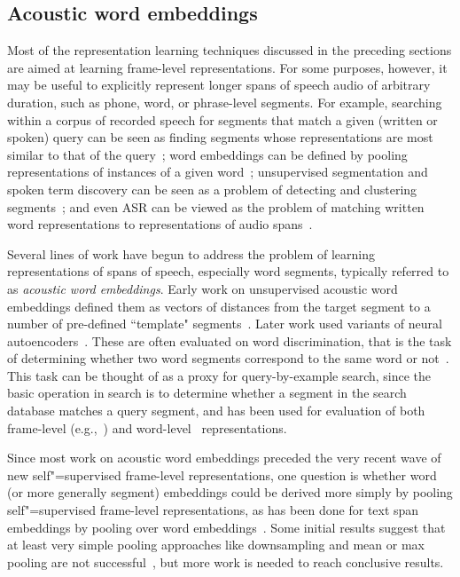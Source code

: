\subsection{Acoustic word embeddings}

Most of the representation learning techniques discussed in the preceding sections are aimed at learning frame-level representations. For some purposes, however, it may be useful to explicitly represent longer spans of speech audio of arbitrary duration, such as phone, word, or phrase-level segments.  For example, searching within a corpus of recorded speech for segments that match a given (written or spoken) query can be seen as finding segments whose representations are most similar to that of the query~\parencite{levin_segmental_2015,chen_querybyexample_2015,chung_audio_2016,settle_querybyexample_2017}; word embeddings can be defined by pooling representations of instances of a given word~\parencite{chung_speech2vec_2018}; unsupervised segmentation and spoken term discovery can be seen as a problem of detecting and clustering segments~\parencite{kamper_embedded_2017,kamper_segmental_2017}; and even ASR can be viewed as the problem of matching written word representations to representations of audio spans~\parencite{maas_wordlevel_2012,bengio_word_2014,settle_acoustically_2019}.  

Several lines of work have begun to address the problem of learning representations of spans of speech, especially word segments, typically referred to as \textit{acoustic word embeddings}.  Early work on unsupervised acoustic word embeddings defined them as vectors of distances from the target segment to a number of pre-defined ``template" segments~\parencite{levin_fixeddimensional_2013}. Later work used variants of neural autoencoders~\parencite{chung_audio_2016,holzenberger_learning_2018,kamper_truly_2019,peng_correspondence_2020}. These are often evaluated on word discrimination, that is the task of determining whether two word segments correspond to the same word or not~\parencite{carlin_rapid_2011}. This task can be thought of as a proxy for query-by-example search, since the basic operation in search is to determine whether a segment in the search database matches a query segment, and has been used for evaluation of both frame-level (e.g.,~\parencite{kamper_unsupervised_2015}) and word-level~\parencite{levin_fixeddimensional_2013,kamper_deep_2016} representations.

Since most work on acoustic word embeddings preceded the very recent wave of new self"=supervised frame-level representations, one question is whether word (or more generally segment) embeddings could be derived more simply by pooling self"=supervised frame-level representations, as has been done for text span embeddings by pooling over word embeddings~\parencite{toshniwal_crosstask_2020,wang_phrasebert_2021}. Some initial results suggest that at least very simple pooling approaches like downsampling and mean or max pooling are not successful~\parencite{vanstaden_comparison_2021,peng_correspondence_2020}, but more work is needed to reach conclusive results.
